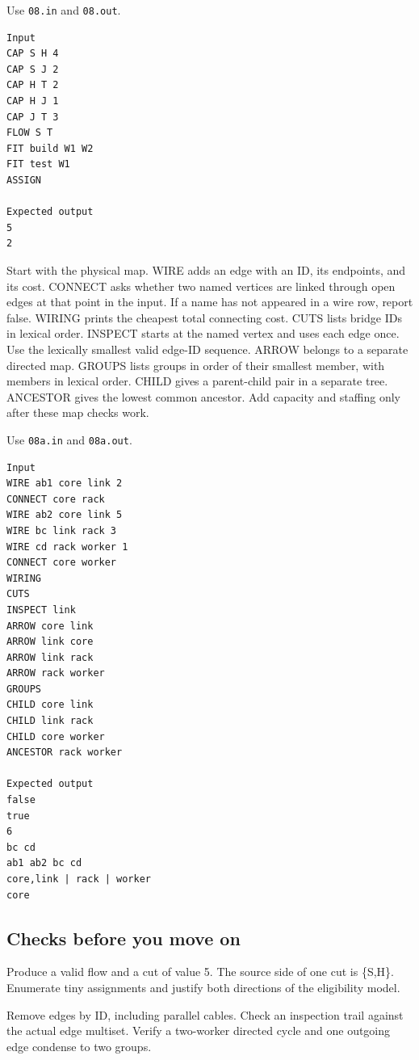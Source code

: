 \documentclass[11pt,letterpaper]{article}
\begin{document}
Use \texttt{08.in} and \texttt{08.out}.

\begin{samepage}
\small
\begin{verbatim}
Input
CAP S H 4
CAP S J 2
CAP H T 2
CAP H J 1
CAP J T 3
FLOW S T
FIT build W1 W2
FIT test W1
ASSIGN

Expected output
5
2
\end{verbatim}
\end{samepage}

Start with the physical map. WIRE adds an edge with an ID, its endpoints, and its cost. CONNECT asks whether two named vertices are linked through open edges at that point in the input. If a name has not appeared in a wire row, report false. WIRING prints the cheapest total connecting cost. CUTS lists bridge IDs in lexical order. INSPECT starts at the named vertex and uses each edge once. Use the lexically smallest valid edge-ID sequence. ARROW belongs to a separate directed map. GROUPS lists groups in order of their smallest member, with members in lexical order. CHILD gives a parent-child pair in a separate tree. ANCESTOR gives the lowest common ancestor. Add capacity and staffing only after these map checks work.

Use \texttt{08a.in} and \texttt{08a.out}.

\begin{samepage}
\small
\begin{verbatim}
Input
WIRE ab1 core link 2
CONNECT core rack
WIRE ab2 core link 5
WIRE bc link rack 3
WIRE cd rack worker 1
CONNECT core worker
WIRING
CUTS
INSPECT link
ARROW core link
ARROW link core
ARROW link rack
ARROW rack worker
GROUPS
CHILD core link
CHILD link rack
CHILD core worker
ANCESTOR rack worker

Expected output
false
true
6
bc cd
ab1 ab2 bc cd
core,link | rack | worker
core
\end{verbatim}
\end{samepage}

\subsection*{Checks before you move on}

Produce a valid flow and a cut of value 5. The source side of one cut is \{S,H\}. Enumerate tiny assignments and justify both directions of the eligibility model.

Remove edges by ID, including parallel cables. Check an inspection trail against the actual edge multiset. Verify a two-worker directed cycle and one outgoing edge condense to two groups.
\end{document}

